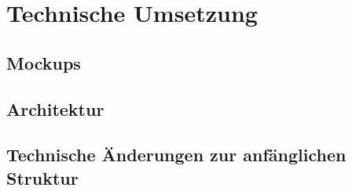 
\chapter{Technische Umsetzung}

\section{Mockups}

\section{Architektur}

\section{Technische Änderungen zur anfänglichen Struktur} \label{tech_changes}
